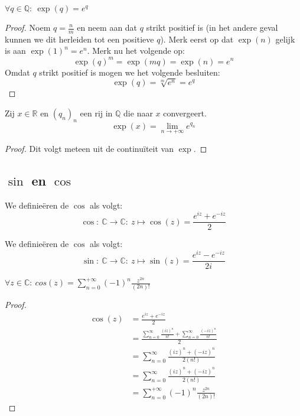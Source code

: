 \documentclass[main.tex]{subfiles}
\begin{document}
\begin{bpr}
  $\forall q \in \mathbb{Q}:\ \exp(q) = e^{q}$

  \begin{proof}
    Noem $q = \frac{n}{m}$ en neem aan dat $q$ strikt positief is (in het andere geval kunnen we dit herleiden tot een positieve $q$).
    Merk eerst op dat $\exp(n)$ gelijk is aan $\exp(1)^{n} = e^{n}$.
    Merk nu het volgende op:
    \[ \exp(q)^{m} = \exp(mq) = \exp(n) = e^{n} \]
    Omdat $q$ strikt positief is mogen we het volgende besluiten: 
    \[ \exp(q) = \sqrt[m]{e^{n}} = e^{q} \]
  \end{proof}
\end{bpr}

\begin{bpr}
  Zij $x\in \mathbb{R}$ en $(q_{n})_{n}$ een rij in $\mathbb{Q}$ die naar $x$ convergeert.
  \[ \exp(x) = \lim_{n\rightarrow +\infty}e^{q_{n}} \]

  \begin{proof}
    Dit volgt meteen uit de continu\"iteit van $\exp$.\needed
  \end{proof}
\end{bpr}


\subsection{$\sin$ en $\cos$}
\label{sec:sin-en-cos}

\begin{de}
  We definie\"eren de  $\cos$ als volgt:
  \[ \cos:\ \mathbb{C} \rightarrow \mathbb{C}:\ z \mapsto \cos(z) = \frac{e^{iz} + e^{-iz}}{2} \]
\end{de}

\begin{de}
  We definie\"eren de  $\cos$ als volgt:
  \[ \sin:\ \mathbb{C} \rightarrow \mathbb{C}:\ z \mapsto \sin(z) = \frac{e^{iz} - e^{-iz}}{2i} \]
\end{de}

\begin{bpr}
  $\forall z \in \mathbb{C}:\ cos(z) = \sum_{n=0}^{+\infty}(-1)^{n}\frac{z^{2n}}{(2n)!}$

  \begin{proof}
    \begin{align*}
      \cos(z)
      &= \frac{e^{iz} + e^{-iz}}{2}\\
      &= \frac{\sum_{n=0}^{\infty}\frac{(iz)^{n}}{n!} + \sum_{n=0}^{\infty}\frac{(-iz)^{n}}{n!}}{2}\\
      &= \sum_{n=0}^{\infty}\frac{(iz)^{n} + (-iz)^{n}}{2(n!)}\\
      &= \sum_{n=0}^{\infty}\frac{(iz)^{n} + (-iz)^{n}}{2(n!)}\\
      &= \sum_{n=0}^{+\infty}(-1)^{n}\frac{z^{2n}}{(2n)!}
    \end{align*}
  \end{proof}
\end{bpr}
\end{document}
